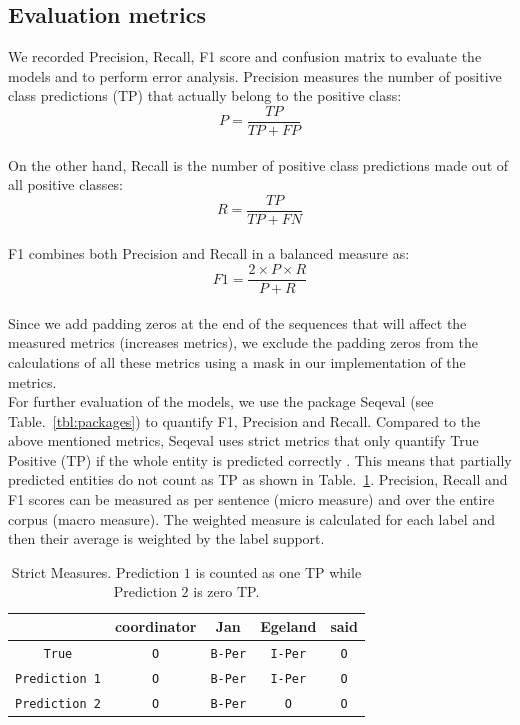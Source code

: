 \documentclass[sigconf, nonacm, natbib, screen, balance=False]{acmart}
\begin{document}
\subsection{Evaluation metrics}\label{sec:metrics}
We recorded Precision, Recall, F1 score \citep{Powers2008EvaluationFP} and confusion matrix to evaluate the models and to perform error analysis. Precision measures the number of positive class predictions (TP) that actually belong to the positive class:
\begin{equation}
     P = \frac{TP}{TP+FP}
    \label{eq:prec_form}
\end{equation} 
\hfill\\
On the other hand, Recall is the number of positive class predictions made out of all positive classes:
\begin{equation}
     R = \frac{TP}{TP+FN}
    \label{eq:recall_form}
\end{equation} 
\hfill\\
F1 combines both Precision and Recall in a balanced measure as:
\begin{equation}
     F1 = \frac{2 \times P \times R}{P+R}
    \label{eq:f1_form}
\end{equation} 
\hfill\\
Since we add padding zeros at the end of the sequences that will affect the measured metrics (increases metrics), we exclude the padding zeros from the calculations of all these metrics using a mask in our implementation of the metrics.
\hfill\\
For further evaluation of the models, we use the package Seqeval (see Table.~\ref{tbl:packages}) to quantify F1, Precision and Recall. Compared to the above mentioned metrics, Seqeval uses strict metrics that only quantify True Positive (TP) if the whole entity is predicted correctly \citep{seqeval}. This means that partially predicted entities do not count as TP as shown in Table.~\ref{tbl:strict}. Precision, Recall and F1 scores can be measured as per sentence (micro measure) and over the entire corpus (macro measure). The weighted measure is calculated for each label and then their average is weighted by the label support.

\begin{table}
  \caption{Strict Measures. Prediction $1$ is counted as one TP while Prediction $2$ is zero TP.}
  \label{tbl:strict}
  \begin{tabular}{c|c|c|c|c}  
    \hline
    &coordinator & Jan & Egeland & said \\\hline
    \verb!True! & \verb!O! & \verb!B-Per! & \verb!I-Per! & \verb!O! \\
    \verb!Prediction 1! & \verb!O! & \verb!B-Per! & \verb!I-Per! & \verb!O! \\
    \verb!Prediction 2! & \verb!O! & \verb!B-Per! & \verb!O! & \verb!O! \\\hline
  \end{tabular}
\end{table}
\hfill\\
\end{document}
